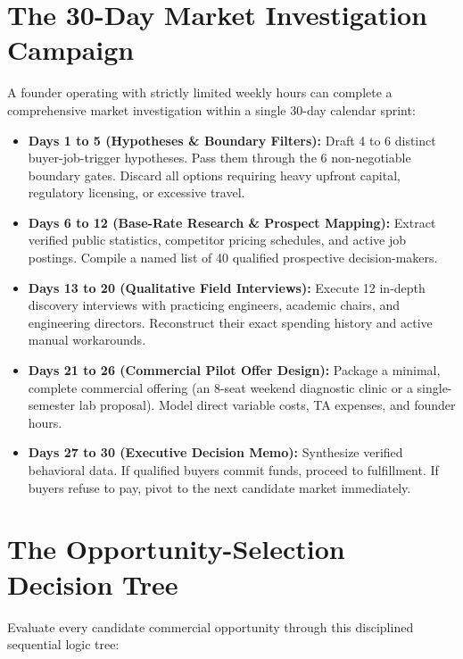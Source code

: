 \section{The 30-Day Market Investigation Campaign}

A founder operating with strictly limited weekly hours can complete a comprehensive market investigation within a single 30-day calendar sprint:

\begin{itemize}[leftmargin=12pt,itemsep=3pt,topsep=2pt]
  \item \textbf{Days 1 to 5 (Hypotheses \& Boundary Filters):} Draft 4 to 6 distinct buyer-job-trigger hypotheses. Pass them through the 6 non-negotiable boundary gates. Discard all options requiring heavy upfront capital, regulatory licensing, or excessive travel.
  \item \textbf{Days 6 to 12 (Base-Rate Research \& Prospect Mapping):} Extract verified public statistics, competitor pricing schedules, and active job postings. Compile a named list of 40 qualified prospective decision-makers.
  \item \textbf{Days 13 to 20 (Qualitative Field Interviews):} Execute 12 in-depth discovery interviews with practicing engineers, academic chairs, and engineering directors. Reconstruct their exact spending history and active manual workarounds.
  \item \textbf{Days 21 to 26 (Commercial Pilot Offer Design):} Package a minimal, complete commercial offering (an 8-seat weekend diagnostic clinic or a single-semester lab proposal). Model direct variable costs, TA expenses, and founder hours.
  \item \textbf{Days 27 to 30 (Executive Decision Memo):} Synthesize verified behavioral data. If qualified buyers commit funds, proceed to fulfillment. If buyers refuse to pay, pivot to the next candidate market immediately.
\end{itemize}

\section{The Opportunity-Selection Decision Tree}

Evaluate every candidate commercial opportunity through this disciplined sequential logic tree:

